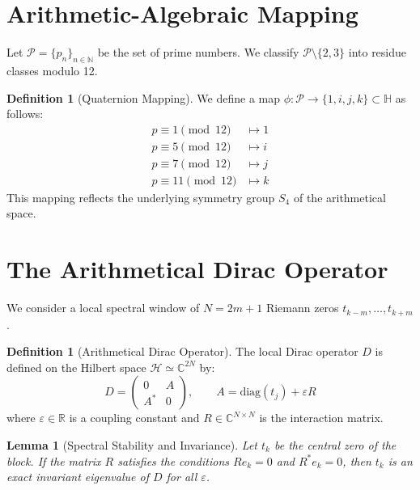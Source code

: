 \documentclass[11pt,a4paper,reqno]{article}
\theoremstyle{plain}
\newtheorem{lemma}[theorem]{Lemma}
\theoremstyle{definition}
\newtheorem{definition}[theorem]{Definition}
\theoremstyle{remark}
\newcommand{\eps}{\varepsilon}
\newcommand{\RR}{\mathbb{R}}
\newcommand{\CC}{\mathbb{C}}
\begin{document}
\section{Arithmetic-Algebraic Mapping}

Let $\mathcal{P} = \{p_n\}_{n \in \mathbb{N}}$ be the set of prime numbers. We classify $\mathcal{P} \setminus \{2,3\}$ into residue classes modulo 12.

\begin{definition}[Quaternion Mapping]
We define a map $\phi: \mathcal{P} \to \{1, i, j, k\} \subset \mathbb{H}$ as follows:
\begin{align*}
    p \equiv 1 \pmod{12} &\mapsto 1 \\
    p \equiv 5 \pmod{12} &\mapsto i \\
    p \equiv 7 \pmod{12} &\mapsto j \\
    p \equiv 11 \pmod{12} &\mapsto k 
\end{align*}
This mapping reflects the underlying symmetry group $S_4$ of the arithmetical space.
\end{definition}

\section{The Arithmetical Dirac Operator}

We consider a local spectral window of $N=2m+1$ Riemann zeros $t_{k-m}, \dots, t_{k+m}$.

\begin{definition}[Arithmetical Dirac Operator]
The local Dirac operator $D$ is defined on the Hilbert space $\mathcal{H} \simeq \mathbb{C}^{2N}$ by:
\begin{equation}
D = \begin{pmatrix} 0 & A \\ A^* & 0 \end{pmatrix}, \qquad A = \text{diag}(t_j) + \eps R
\end{equation}
where $\eps \in \RR$ is a coupling constant and $R \in \CC^{N \times N}$ is the interaction matrix.
\end{definition}

\begin{lemma}[Spectral Stability and Invariance]
Let $t_k$ be the central zero of the block. If the matrix $R$ satisfies the conditions $R e_k = 0$ and $R^* e_k = 0$, then $t_k$ is an exact invariant eigenvalue of $D$ for all $\eps$.
\end{lemma}
\end{document}
